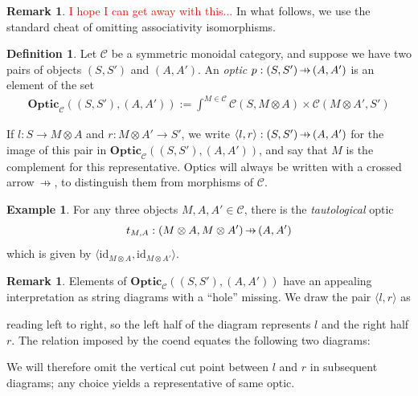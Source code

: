 \documentclass[11pt,a4paper]{article}
\theoremstyle{plain}
\theoremstyle{definition}
\newtheorem{definition}[theorem]{Definition}
\newtheorem{example}[theorem]{Example}
\newtheorem{remark}[theorem]{Remark}
\newcommand{\C}{\mathscr{C}}
\newcommand{\Optic}{\mathbf{Optic}}
\newcommand{\id}{\mathrm{id}}
\newcommand{\hto}{\ensuremath{\,\mathaccent\shortmid\rightarrow\,}}
\newcommand{\todo}[1]{\textcolor{red}{\small #1}}
\begin{document}
\begin{remark}
\todo{I hope I can get away with this...} In what follows, we use the standard cheat of omitting associativity isomorphisms.
\end{remark}

\begin{definition}
Let $\C$ be a symmetric monoidal category, and suppose we have two pairs of objects $(S, S')$ and $(A, A')$. An \emph{optic} $p : (S, S') \hto (A, A')$ is an element of the set
\begin{align*}
\Optic_\C((S, S'), (A, A')) := \int^{M \in \C} \C(S, M \otimes A) \times \C(M \otimes A', S')
\end{align*}
\end{definition}

If $l : S \to M \otimes A$ and $r : M \otimes A' \to S'$, we write $\langle l, r \rangle : (S, S') \hto (A, A')$ for the image of this pair in $\Optic_\C((S, S'), (A, A'))$, and say that $M$ is the complement for this representative. Optics will always be written with a crossed arrow $\hto$, to distinguish them from morphisms of $\C$.

\begin{example}
For any three objects $M, A, A' \in \C$, there is the \emph{tautological} optic \[t_{M,A} : (M \otimes A, M \otimes A') \hto (A, A')\] which is given by $\langle \id_{M \otimes A}, \id_{M \otimes A'} \rangle$.
\end{example}

\begin{remark}
Elements of $\Optic_\C((S, S'), (A, A'))$ have an appealing interpretation as string diagrams with a ``hole'' missing. We draw the pair $\langle l, r \rangle$ as
\begin{center}

\end{center}
reading left to right, so the left half of the diagram represents $l$ and the right half $r$. The relation imposed by the coend equates the following two diagrams:
\begin{center}
 
\qquad

\end{center}
We will therefore omit the vertical cut point between $l$ and $r$ in subsequent diagrams; any choice yields a representative of same optic.
\end{remark}
\end{document}
